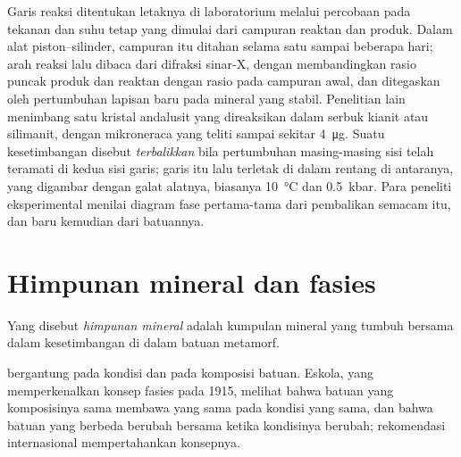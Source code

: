 \begin{inthelab}
Garis reaksi ditentukan letaknya di laboratorium melalui percobaan pada tekanan dan
suhu tetap yang dimulai dari campuran reaktan dan produk. Dalam alat piston--silinder,
campuran itu ditahan selama satu sampai beberapa hari; arah reaksi lalu
dibaca dari difraksi sinar-X, dengan membandingkan rasio puncak produk dan reaktan
dengan rasio pada campuran awal, dan ditegaskan oleh pertumbuhan lapisan baru pada mineral yang stabil. Penelitian
lain menimbang satu kristal andalusit yang direaksikan dalam serbuk kianit atau
silimanit, dengan mikroneraca yang teliti sampai sekitar \qty{4}{\micro g}. Suatu kesetimbangan
disebut \emph{terbalikkan} bila pertumbuhan masing-masing sisi telah teramati di kedua sisi garis;
garis itu lalu terletak di dalam rentang di antaranya, yang digambar dengan galat alatnya,
biasanya \qty{10}{\celsius} dan \qty{0.5}{kbar}. Para peneliti eksperimental menilai diagram fase pertama-tama
dari pembalikan semacam itu, dan baru kemudian dari batuannya.
\end{inthelab}

\section{Himpunan mineral dan fasies}\label{sec:b2:metamorphic-facies:facies}

\begin{definition}\label{def:b2:metamorphic-facies:assemblage}
Yang disebut \emph{himpunan mineral} adalah kumpulan mineral yang tumbuh
bersama dalam kesetimbangan di dalam batuan metamorf.
\end{definition}

 bergantung pada kondisi  dan pada komposisi
batuan. Eskola, yang memperkenalkan konsep fasies pada 1915, melihat bahwa batuan yang
komposisinya sama membawa  yang sama pada kondisi yang sama, dan bahwa
 batuan yang berbeda berubah bersama ketika kondisinya berubah;
rekomendasi internasional mempertahankan konsepnya.

